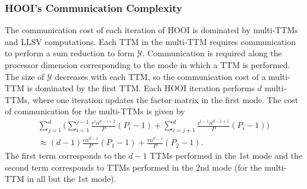     \subsubsection{HOOI's Communication Complexity}
        The communication cost of each iteration of HOOI is dominated by multi-TTMs and
        LLSV computations. Each TTM in the multi-TTM requires communication to perform a
        sum reduction to form $\mathcal{Y}$. Communication is required along the processor
        dimension corresponding to the mode in which a TTM is performed.
        The size of $\mathcal{Y}$ decreases with each TTM, so the communication cost of a
        multi-TTM is dominated by the first TTM. Each HOOI iteration performs $d$
        multi-TTMs, where one iteration updates the factor matrix in the first mode.
        The cost of communication for the multi-TTMs is given by
        \begin{multline*}
            \sum_{j=1}^d \bigg(\sum_{i=1}^{j-1} \frac{r^in^{d-i+2}}{P}(P_i-1) + \sum_{i=j+1}^{d} \frac{r^{i-1}n^{d-1+1}}{P}(P_i-1)\bigg) \\ \approx (d-1)\frac{rn^{d-1}}{P}(P_1 - 1) + \frac{rn^{d-1}}{P}(P_2 - 1).
        \end{multline*}
        The first term corresponds to the $d-1$ TTMs performed in the 1st mode and the
        second term corresponds to TTMs performed in the 2nd mode (for the multi-TTM in
        all but the 1st mode).

